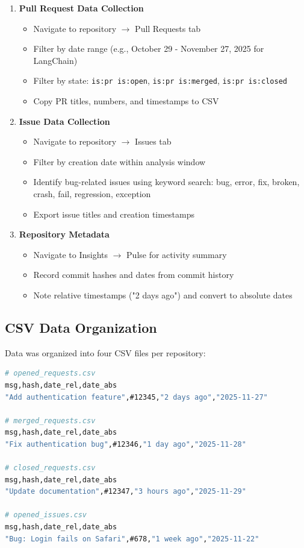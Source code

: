 \begin{enumerate}
    \item \textbf{Pull Request Data Collection}
    \begin{itemize}
        \item Navigate to repository $\rightarrow$ Pull Requests tab
        \item Filter by date range (e.g., October 29 - November 27, 2025 for LangChain)
        \item Filter by state: \texttt{is:pr is:open}, \texttt{is:pr is:merged}, \texttt{is:pr is:closed}
        \item Copy PR titles, numbers, and timestamps to CSV
    \end{itemize}

    \item \textbf{Issue Data Collection}
    \begin{itemize}
        \item Navigate to repository $\rightarrow$ Issues tab
        \item Filter by creation date within analysis window
        \item Identify bug-related issues using keyword search: bug, error, fix, broken, crash, fail, regression, exception
        \item Export issue titles and creation timestamps
    \end{itemize}

    \item \textbf{Repository Metadata}
    \begin{itemize}
        \item Navigate to Insights $\rightarrow$ Pulse for activity summary
        \item Record commit hashes and dates from commit history
        \item Note relative timestamps ("2 days ago") and convert to absolute dates
    \end{itemize}
\end{enumerate}

\subsection{CSV Data Organization}

Data was organized into four CSV files per repository:

\begin{lstlisting}[language=bash, caption=CSV File Structure]
# opened_requests.csv
msg,hash,date_rel,date_abs
"Add authentication feature",#12345,"2 days ago","2025-11-27"

# merged_requests.csv
msg,hash,date_rel,date_abs
"Fix authentication bug",#12346,"1 day ago","2025-11-28"

# closed_requests.csv
msg,hash,date_rel,date_abs
"Update documentation",#12347,"3 hours ago","2025-11-29"

# opened_issues.csv
msg,hash,date_rel,date_abs
"Bug: Login fails on Safari",#678,"1 week ago","2025-11-22"
\end{lstlisting}

